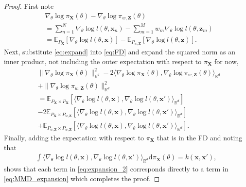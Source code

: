 \documentclass[10pt,a4paper]{amsart}
\newcommand{\bX}{\mathbf{X}}
\newcommand{\bZ}{\mathbf{Z}}
\newcommand{\bbE}{\mathbb{E}}
\newcommand{\bbR}{\mathbb{R}}
\newcommand{\bx}{\mathbf{x}}
\newcommand{\bz}{\mathbf{z}}
\begin{document}
\begin{proof}
	First note 
	\begin{align}
		& \nabla_{\theta}\log\pi_{\bX}(\theta) - \nabla_{\theta}\log\pi_{w,\bZ}(\theta)\nonumber \\
		& = \sum_{n=1}^{N}\nabla_{\theta}\log l(\theta,\bx_{n}) - \sum_{m=1}^{M}w_{m}\nabla_{\theta}\log l(\theta,\bz_{m})\nonumber\\
		& = \bbE_{P_{\bX}}[\nabla_{\theta}\log l(\theta,\bx)] - \bbE_{P_{w,\bZ}}[\nabla_{\theta}\log l(\theta,\bz)].\label{eq:expand}
	\end{align}
	Next, substitute \eqref{eq:expand} into \eqref{eq:FD} and expand the squared norm as an inner product, not including the outer expectation with respect to $\pi_{\bX}$ for now,
	\begin{align}
		&\lVert\nabla_{\theta}\log\pi_{\bX}(\theta)\rVert_{\bbR^{d}}^{2} - 2\langle \nabla_{\theta}\log\pi_{\bX}(\theta),\nabla_{\theta}\log \pi_{w,\bZ}(\theta)\rangle_{\bbR^{d}}\nonumber \\
		& + \lVert\nabla_{\theta}\log\pi_{w,\bZ}(\theta)\rVert_{\bbR^{d}}^{2}\nonumber\\
		& = \bbE_{P_{\bX}\times P_{\bX}}[\langle \nabla_{\theta}\log l(\theta,\bx),\nabla_{\theta}\log l(\theta,\bx')\rangle_{\bbR^{d}}]\nonumber \\
		& - 2\bbE_{P_{\bX}\times P_{w,\bZ}}[\langle \nabla_{\theta}\log l(\theta,\bx),\nabla_{\theta}\log l(\theta,\bx')\rangle_{\bbR^{d}}]\label{eq:expansion_2}\\
		& + \bbE_{P_{w,\bZ}\times P_{w,\bZ}}[\langle \nabla_{\theta}\log l(\theta,\bx),\nabla_{\theta}\log l(\theta,\bx')\rangle_{\bbR^{d}}].\nonumber
	\end{align} 
	Finally, adding the expectation with respect to $\pi_{\bX}$ that is in the FD and noting that 
	\begin{align*}
		\int\langle \nabla_{\theta}\log l(\theta,\bx),\nabla_{\theta}\log l(\theta,\bx')\rangle_{\bbR^{d}}\mathrm{d}\pi_{\bX}(\theta) = k(\bx,\bx'),
	\end{align*}
	shows that each term in \eqref{eq:expansion_2} corresponds directly to a term in \eqref{eq:MMD_expansion} which completes the proof. 
\end{proof}
\end{document}
